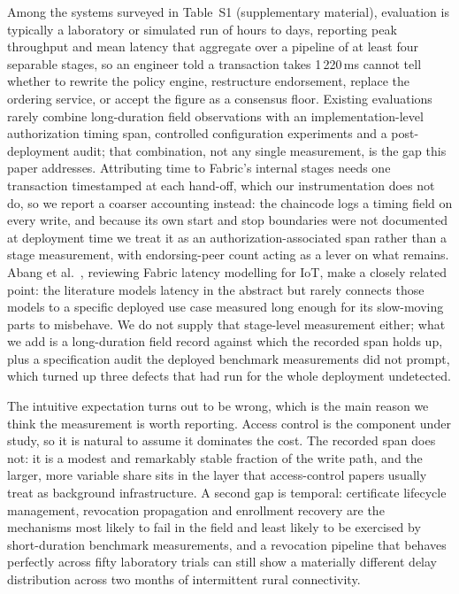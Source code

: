 \documentclass[a4paper,fleqn]{cas-sc}
\begin{document}
Among the systems surveyed in Table~S1 (supplementary material), evaluation
is typically a laboratory or simulated run of hours to days, reporting peak
throughput and mean latency that aggregate over a pipeline of at least four
separable stages, so an engineer told a transaction takes 1\,220\,ms cannot
tell whether to rewrite the policy engine, restructure endorsement, replace
the ordering service, or accept the figure as a consensus floor. Existing
evaluations rarely combine long-duration field observations with an
implementation-level authorization timing span, controlled configuration
experiments and a post-deployment audit; that combination, not any single
measurement, is the gap this paper addresses. Attributing time to Fabric's
internal stages needs one transaction timestamped at each hand-off, which
our instrumentation does not do, so we report a coarser accounting instead:
the chaincode logs a timing field on every write, and because its own start
and stop boundaries were not documented at deployment time we treat it as an
authorization-associated span rather than a stage measurement, with
endorsing-peer count acting as a lever on what remains. Abang et
al.\ \cite{abang2024latency}, reviewing Fabric latency modelling for IoT,
make a closely related point: the literature models latency in the abstract
but rarely connects those models to a specific deployed use case measured
long enough for its slow-moving parts to misbehave. We do not supply that
stage-level measurement either; what we add is a long-duration field record
against which the recorded span holds up, plus a specification audit the
deployed benchmark measurements did not prompt, which turned up three
defects that had run for the whole deployment undetected.

The intuitive expectation turns out to be wrong, which is the main reason we
think the measurement is worth reporting. Access control is the component
under study, so it is natural to assume it dominates the cost. The recorded
span does not: it is a modest and remarkably stable fraction of the write
path, and the larger, more variable share sits in the layer that
access-control papers usually treat as background infrastructure. A second
gap is temporal: certificate lifecycle management, revocation propagation
and enrollment recovery are the mechanisms most likely to fail in the field
and least likely to be exercised by short-duration benchmark measurements,
and a revocation pipeline that behaves perfectly across fifty laboratory
trials
can still show a materially different delay distribution across two months
of intermittent rural connectivity.
\end{document}
